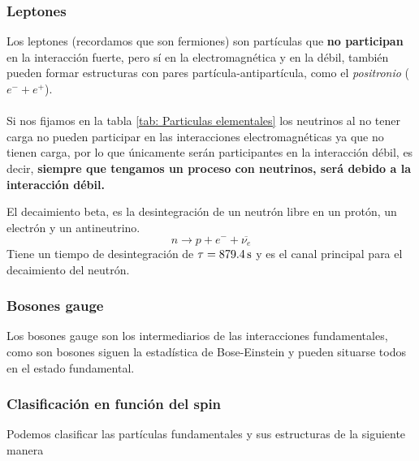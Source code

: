\subsubsection{Leptones}
Los leptones (recordamos que son fermiones) son partículas que \textbf{no participan} en la interacción fuerte, pero sí en la electromagnética y en la débil, también pueden formar estructuras con pares partícula-antipartícula, como el \textit{positronio} ($e^-+e^+$).\\\\
Si nos fijamos en la tabla \ref{tab: Particulas elementales} los neutrinos al no tener carga no pueden participar en las interacciones electromagnéticas ya que no tienen carga, por lo que únicamente serán participantes en la interacción débil, es decir, \textbf{siempre que tengamos un proceso con neutrinos, será debido a la interacción débil.}

\begin{tcolorbox}[colback=airforceblue!20, colframe=airforceblue, title=Ejemplo: Interacción débil: Decaimiento beta ]
El decaimiento beta, es la desintegración de un neutrón libre en un protón, un electrón y un antineutrino. 
\begin{equation*}
      n\longrightarrow p+e^-+\overline{\nu_e}
\end{equation*}
Tiene un tiempo de desintegración de $\tau=\unit[879.4]{s}$ y es el canal principal para el decaimiento del neutrón.
\end{tcolorbox}
\subsubsection{Bosones gauge}
Los bosones gauge son los intermediarios de las interacciones fundamentales, como son bosones siguen la estadística de Bose-Einstein y pueden situarse todos en el estado fundamental.
\subsubsection{Clasificación en función del spin}
Podemos clasificar las partículas fundamentales y sus estructuras de la siguiente manera 

